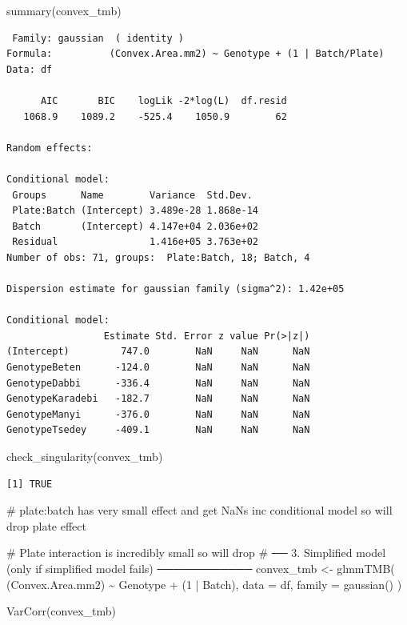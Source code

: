 \documentclass[
  letterpaper,
  DIV=11,
  numbers=noendperiod]{scrartcl}
\newenvironment{Shaded}{\begin{snugshade}}{\end{snugshade}}
\newcommand{\AttributeTok}[1]{\textcolor[rgb]{0.40,0.45,0.13}{#1}}
\newcommand{\CommentTok}[1]{\textcolor[rgb]{0.37,0.37,0.37}{#1}}
\newcommand{\DecValTok}[1]{\textcolor[rgb]{0.68,0.00,0.00}{#1}}
\newcommand{\FunctionTok}[1]{\textcolor[rgb]{0.28,0.35,0.67}{#1}}
\newcommand{\NormalTok}[1]{\textcolor[rgb]{0.00,0.23,0.31}{#1}}
\newcommand{\OtherTok}[1]{\textcolor[rgb]{0.00,0.23,0.31}{#1}}
\newcommand{\SpecialCharTok}[1]{\textcolor[rgb]{0.37,0.37,0.37}{#1}}
\begin{document}
\begin{Shaded}
\begin{Highlighting}[]
\FunctionTok{summary}\NormalTok{(convex\_tmb)}
\end{Highlighting}
\end{Shaded}

\begin{verbatim}
 Family: gaussian  ( identity )
Formula:          (Convex.Area.mm2) ~ Genotype + (1 | Batch/Plate)
Data: df

      AIC       BIC    logLik -2*log(L)  df.resid 
   1068.9    1089.2    -525.4    1050.9        62 

Random effects:

Conditional model:
 Groups      Name        Variance  Std.Dev. 
 Plate:Batch (Intercept) 3.489e-28 1.868e-14
 Batch       (Intercept) 4.147e+04 2.036e+02
 Residual                1.416e+05 3.763e+02
Number of obs: 71, groups:  Plate:Batch, 18; Batch, 4

Dispersion estimate for gaussian family (sigma^2): 1.42e+05 

Conditional model:
                 Estimate Std. Error z value Pr(>|z|)
(Intercept)         747.0        NaN     NaN      NaN
GenotypeBeten      -124.0        NaN     NaN      NaN
GenotypeDabbi      -336.4        NaN     NaN      NaN
GenotypeKaradebi   -182.7        NaN     NaN      NaN
GenotypeManyi      -376.0        NaN     NaN      NaN
GenotypeTsedey     -409.1        NaN     NaN      NaN
\end{verbatim}

\begin{Shaded}
\begin{Highlighting}[]
\FunctionTok{check\_singularity}\NormalTok{(convex\_tmb) }
\end{Highlighting}
\end{Shaded}

\begin{verbatim}
[1] TRUE
\end{verbatim}

\begin{Shaded}
\begin{Highlighting}[]
\CommentTok{\# plate:batch has very small effect and get NaNs inc conditional model so will drop plate effect}

\CommentTok{\# Plate interaction is incredibly small so will drop }
\CommentTok{\# ── 3. Simplified model (only if simplified model fails) ────────────}
\NormalTok{convex\_tmb }\OtherTok{\textless{}{-}} \FunctionTok{glmmTMB}\NormalTok{(}
\NormalTok{  (Convex.Area.mm2) }\SpecialCharTok{\textasciitilde{}}\NormalTok{ Genotype }\SpecialCharTok{+}\NormalTok{ (}\DecValTok{1} \SpecialCharTok{|}\NormalTok{ Batch),}
  \AttributeTok{data =}\NormalTok{ df, }\AttributeTok{family =} \FunctionTok{gaussian}\NormalTok{()}
\NormalTok{)}

\FunctionTok{VarCorr}\NormalTok{(convex\_tmb)}
\end{Highlighting}
\end{Shaded}
\end{document}
